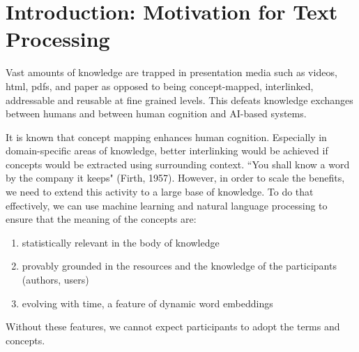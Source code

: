 \section{Introduction: Motivation for Text Processing} \label{Introduction} 

Vast amounts of knowledge are trapped in presentation media such as videos, html, pdfs, and paper as opposed to being concept-mapped, interlinked, addressable and reusable at fine grained levels. This defeats knowledge exchanges between humans and between human cognition and AI-based systems.

It is known that concept mapping enhances human cognition. Especially in domain-specific areas of knowledge, better interlinking would be achieved if concepts would be extracted using surrounding context. ``You shall know a word by the company it keeps" (Firth, 1957). However, in order to scale the benefits, we need to extend this activity to a large base of knowledge. To do that effectively, we can use  machine learning and natural language processing to ensure that the meaning of the concepts are:
\begin{enumerate}
    \item statistically relevant in the body of knowledge
    
    \item provably grounded in the resources and the knowledge of the participants (authors, users)
    
    \item evolving with time, a feature of dynamic word embeddings
    
\end{enumerate}

Without these features, we cannot expect participants to adopt the terms and concepts.

